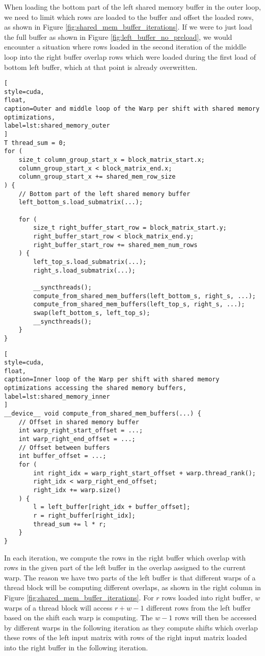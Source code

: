 When loading the bottom part of the left shared memory buffer in the outer loop, we need to limit which rows are loaded to the buffer and offset the loaded rows, as shown in Figure \ref{fig:shared_mem_buffer_iterations}. If we were to just load the full buffer as shown in Figure \ref{fig:left_buffer_no_preload}, we would encounter a situation where rows loaded in the second iteration of the middle loop into the right buffer overlap rows which were loaded during the first load of bottom left buffer, which at that point is already overwritten.  

\begin{lstlisting}[
style=cuda,
float,
caption=Outer and middle loop of the Warp per shift with shared memory optimizations,
label=lst:shared_memory_outer
]
T thread_sum = 0;
for (
	size_t column_group_start_x = block_matrix_start.x;
	column_group_start_x < block_matrix_end.x;
	column_group_start_x += shared_mem_row_size
) {
	// Bottom part of the left shared memory buffer
	left_bottom_s.load_submatrix(...);
	
	for (
		size_t right_buffer_start_row = block_matrix_start.y;
		right_buffer_start_row < block_matrix_end.y;
		right_buffer_start_row += shared_mem_num_rows
	) {
		left_top_s.load_submatrix(...);
		right_s.load_submatrix(...);
		
		__syncthreads();
		compute_from_shared_mem_buffers(left_bottom_s, right_s, ...);
		compute_from_shared_mem_buffers(left_top_s, right_s, ...);
		swap(left_bottom_s, left_top_s);
		__syncthreads();
	}
}
\end{lstlisting}


\begin{lstlisting}[
style=cuda,
float,
caption=Inner loop of the Warp per shift with shared memory optimizations accessing the shared memory buffers,
label=lst:shared_memory_inner
]
__device__ void compute_from_shared_mem_buffers(...) {
	// Offset in shared memory buffer
	int warp_right_start_offset = ...;
	int warp_right_end_offset = ...;
	// Offset between buffers
	int buffer_offset = ...;
	for (
		int right_idx = warp_right_start_offset + warp.thread_rank();
		right_idx < warp_right_end_offset;
		right_idx += warp.size()
	) {
		l = left_buffer[right_idx + buffer_offset];
		r = right_buffer[right_idx];
		thread_sum += l * r; 
	}
}
\end{lstlisting}

In each iteration, we compute the rows in the right buffer which overlap with rows in the given part of the left buffer in the overlap assigned to the current warp. The reason we have two parts of the left buffer is that different warps of a thread block will be computing different overlaps, as shown in the right column in Figure \ref{fig:shared_mem_buffer_iterations}. For $r$ rows loaded into right buffer, $w$ warps of a thread block will access $r + w - 1$ different rows from the left buffer based on the shift each warp is computing. The $w - 1$ rows will then be accessed by different warps in the following iteration as they compute shifts which overlap these rows of the left input matrix with rows of the right input matrix loaded into the right buffer in the following iteration. 



